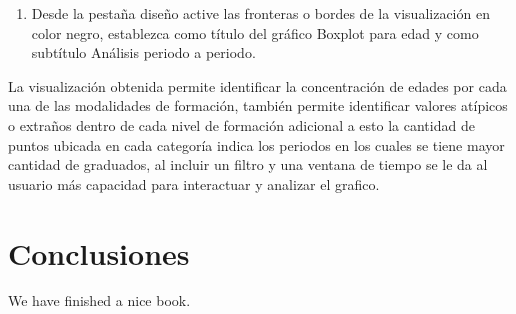 \documentclass[
]{book}
\providecommand{\tightlist}{%
  \setlength{\itemsep}{0pt}\setlength{\parskip}{0pt}}
\begin{document}
\begin{enumerate}
\def\labelenumi{\arabic{enumi}.}
\setcounter{enumi}{7}
\tightlist
\item
  Desde la pestaña diseño active las fronteras o bordes de la visualización en color negro, establezca como título del gráfico Boxplot para edad y como subtítulo Análisis periodo a periodo.
\end{enumerate}

La visualización obtenida permite identificar la concentración de edades por cada una de las modalidades de formación, también permite identificar valores atípicos o extraños dentro de cada nivel de formación adicional a esto la cantidad de puntos ubicada en cada categoría indica los periodos en los cuales se tiene mayor cantidad de graduados, al incluir un filtro y una ventana de tiempo se le da al usuario más capacidad para interactuar y analizar el grafico.

\hypertarget{conclu}{%
\chapter{Conclusiones}\label{conclu}}

We have finished a nice book.

  
\end{document}

